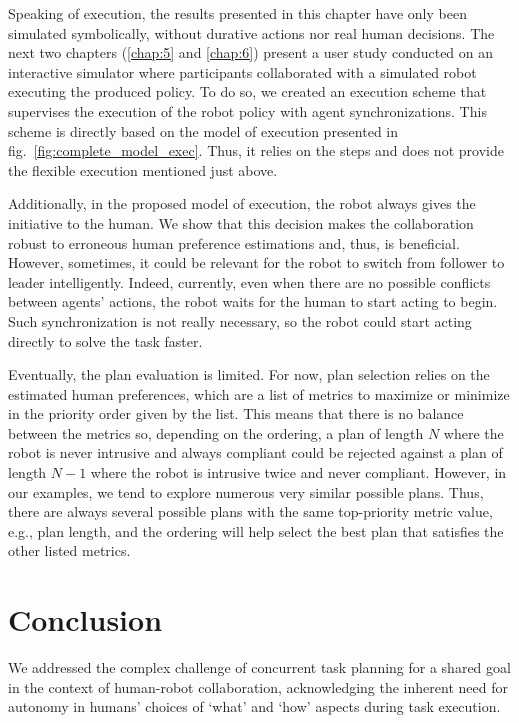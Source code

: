Speaking of execution, the results presented in this chapter have only been simulated symbolically, without durative actions nor real human decisions. The next two chapters (\ref{chap:5} and \ref{chap:6}) present a user study conducted on an interactive simulator where participants collaborated with a simulated robot executing the produced policy. To do so, we created an execution scheme that supervises the execution of the robot policy with agent synchronizations. This scheme is directly based on the model of execution presented in fig.~\ref{fig:complete_model_exec}. Thus, it relies on the steps and does not provide the flexible execution mentioned just above. 

Additionally, in the proposed model of execution, the robot always gives the initiative to the human. We show that this decision makes the collaboration robust to erroneous human preference estimations and, thus, is beneficial. However, sometimes, it could be relevant for the robot to switch from follower to leader intelligently. Indeed, currently, even when there are no possible conflicts between agents' actions, the robot waits for the human to start acting to begin. Such synchronization is not really necessary, so the robot could start acting directly to solve the task faster. 

Eventually, the plan evaluation is limited. For now, plan selection relies on the estimated human preferences, which are a list of metrics to maximize or minimize in the priority order given by the list. This means that there is no balance between the metrics so, depending on the ordering, a plan of length $N$ where the robot is never intrusive and always compliant could be rejected against a plan of length $N-1$ where the robot is intrusive twice and never compliant. 
However, in our examples, we tend to explore numerous very similar possible plans. Thus, there are always several possible plans with the same top-priority metric value, e.g., plan length, and the ordering will help select the best plan that satisfies the other listed metrics.   

\section{Conclusion}

We addressed the complex challenge of concurrent task planning for a shared goal in the context of human-robot collaboration, acknowledging the inherent need for autonomy in humans' choices of `what' and `how' aspects during task execution. 

